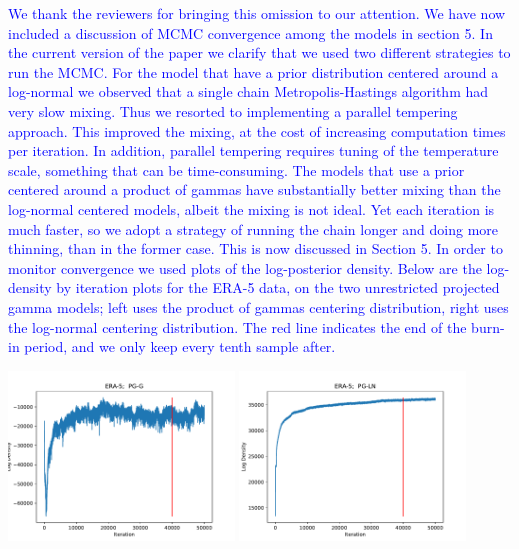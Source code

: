 \documentclass[10pt]{article}
\newcommand{\response}[1]{\textcolor{blue}{#1}}
\begin{document}
\begin{itemize}
\begin{enumerate}
\response{We thank the reviewers for bringing this omission to our attention.  We have now
            included a discussion of MCMC convergence among the models in section 5.  In the current
            version of the paper we clarify that we used two different strategies to run the MCMC.
            For the model that have a prior distribution centered around a log-normal we observed 
            that a single chain Metropolis-Hastings algorithm had very slow mixing. Thus we resorted 
            to implementing a parallel tempering approach. This improved the mixing, at the cost 
            of increasing computation times per iteration. In addition, parallel tempering requires
            tuning of the temperature scale, something that can be time-consuming. The models that
            use a prior centered around a product of gammas have substantially better mixing than the
            log-normal centered models, albeit the mixing is not ideal. Yet each iteration is much
            faster, so we adopt a strategy of running the chain longer and doing more thinning, than 
            in the former case. This is now discussed in Section 5. In order to monitor convergence 
            we used plots of the log-posterior density.
            Below are the log-density by iteration plots for the ERA-5 data, on the two 
            unrestricted projected gamma models; left uses the product of gammas centering distribution, 
            right uses the log-normal centering distribution.  The red line indicates the end of the 
            burn-in period, and we only keep every tenth sample after.
            }
            
            \includegraphics[width=0.45\textwidth]{images/ERA-5-PG-G.pdf}
            \includegraphics[width=0.45\textwidth]{images/ERA-5-PG-LN.pdf} \\
        

\end{enumerate}
\end{itemize}
\end{document}
